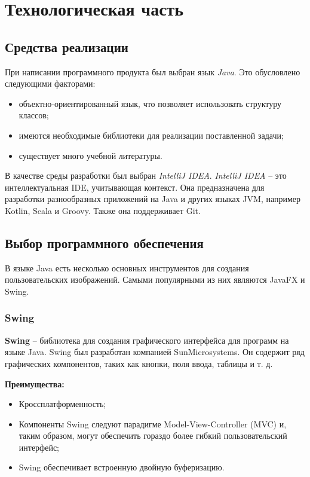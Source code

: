 \chapter{Технологическая часть}

\section{Средства реализации}

При написании программного продукта был выбран язык \textit{Java}. Это обусловлено следующими факторами:

\begin{itemize}
	\item объектно-ориентированный язык, что позволяет использовать структуру классов;
	\item имеются необходимые библиотеки для реализации поставленной задачи;
	\item существует много учебной литературы.
\end{itemize}

В качестве среды разработки был выбран \textit{IntelliJ IDEA}. \textit{IntelliJ IDEA} -- это интеллектуальная IDE, учитывающая контекст. Она предназначена для разработки разнообразных приложений на Java и других языках JVM, например Kotlin, Scala и Groovy. Также она поддерживает Git.

\section{Выбор программного обеспечения}

В языке Java есть несколько основных инструментов для создания пользовательских изображений. Самыми популярными из них являются JavaFX и Swing.

\subsection{Swing}

\textbf{Swing} -- библиотека для создания графического интерфейса для программ на языке Java. Swing был разработан компанией SunMicrosystems. Он содержит ряд графических компонентов, таких как кнопки, поля ввода, таблицы и т. д.

\textbf{Преимущества:} 
\begin{itemize}
	\item Кроссплатформенность;
	\item Компоненты Swing следуют парадигме Model-View-Controller (MVC) и, таким образом, могут обеспечить гораздо более гибкий пользовательский интерфейс;
	\item Swing обеспечивает встроенную двойную буферизацию.
\end{itemize}

